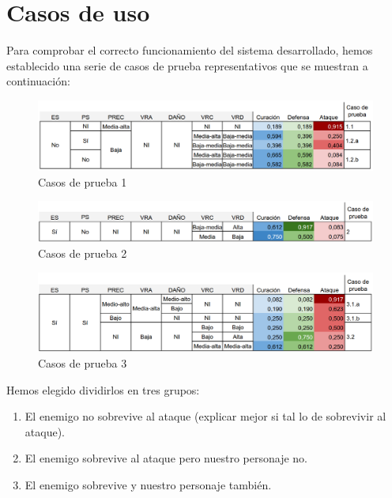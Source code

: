 \section{Casos de uso}

Para comprobar el correcto funcionamiento del sistema desarrollado, hemos establecido una serie de casos de prueba representativos que se muestran a continuación:

\begin{figure}[H]
	\centering
	\includegraphics[width=\textwidth,height=\textheight,keepaspectratio]{images/casos_pruebas.png}
	\caption{Casos de prueba 1}
	\label{fig:sistemas_difusos}
\end{figure}

\begin{figure}[H]
	\centering
	\includegraphics[width=\textwidth,height=\textheight,keepaspectratio]{images/casos_pruebas1.png}
	\caption{Casos de prueba 2}
	\label{fig:sistemas_difusos}
\end{figure}


\begin{figure}[H]
	\centering
	\includegraphics[width=\textwidth,height=\textheight,keepaspectratio]{images/casos_pruebas2.png}
	\caption{Casos de prueba 3}
	\label{fig:sistemas_difusos}
\end{figure}
Hemos elegido dividirlos en tres grupos:
\begin{enumerate}
	\item El enemigo no sobrevive al ataque (explicar mejor si tal lo de sobrevivir al ataque).
	\item El enemigo sobrevive al ataque pero nuestro personaje no.
	\item El enemigo sobrevive y nuestro personaje también.
\end{enumerate}


